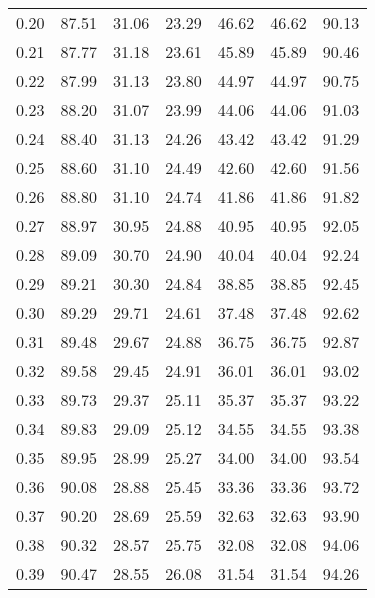 \begin{tabular}{|c|c|c|c|c|c|c|}
      0.20 &     87.51 &     31.06 &      23.29 &   46.62 &      46.62 &         90.13 \\
      0.21 &     87.77 &     31.18 &      23.61 &   45.89 &      45.89 &         90.46 \\
      0.22 &     87.99 &     31.13 &      23.80 &   44.97 &      44.97 &         90.75 \\
      0.23 &     88.20 &     31.07 &      23.99 &   44.06 &      44.06 &         91.03 \\
      0.24 &     88.40 &     31.13 &      24.26 &   43.42 &      43.42 &         91.29 \\
      0.25 &     88.60 &     31.10 &      24.49 &   42.60 &      42.60 &         91.56 \\
      0.26 &     88.80 &     31.10 &      24.74 &   41.86 &      41.86 &         91.82 \\
      0.27 &     88.97 &     30.95 &      24.88 &   40.95 &      40.95 &         92.05 \\
      0.28 &     89.09 &     30.70 &      24.90 &   40.04 &      40.04 &         92.24 \\
      0.29 &     89.21 &     30.30 &      24.84 &   38.85 &      38.85 &         92.45 \\
      0.30 &     89.29 &     29.71 &      24.61 &   37.48 &      37.48 &         92.62 \\
      0.31 &     89.48 &     29.67 &      24.88 &   36.75 &      36.75 &         92.87 \\
      0.32 &     89.58 &     29.45 &      24.91 &   36.01 &      36.01 &         93.02 \\
      0.33 &     89.73 &     29.37 &      25.11 &   35.37 &      35.37 &         93.22 \\
      0.34 &     89.83 &     29.09 &      25.12 &   34.55 &      34.55 &         93.38 \\
      0.35 &     89.95 &     28.99 &      25.27 &   34.00 &      34.00 &         93.54 \\
      0.36 &     90.08 &     28.88 &      25.45 &   33.36 &      33.36 &         93.72 \\
      0.37 &     90.20 &     28.69 &      25.59 &   32.63 &      32.63 &         93.90 \\
      0.38 &     90.32 &     28.57 &      25.75 &   32.08 &      32.08 &         94.06 \\
      0.39 &     90.47 &     28.55 &      26.08 &   31.54 &      31.54 &         94.26 \\

\end{tabular}
